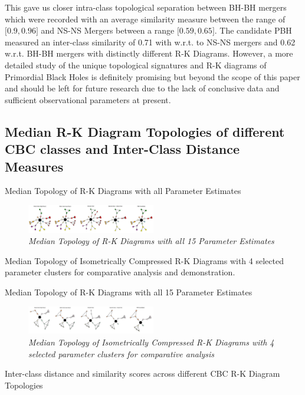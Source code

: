 This gave us closer intra-class topological separation between BH-BH mergers which were recorded with an average similarity measure between the range of $\lbrack0.9, 0.96\rbrack$ and NS-NS Mergers between a range   $\lbrack0.59, 0.65\rbrack$. The candidate PBH measured an inter-class similarity of 0.71 with w.r.t. to NS-NS mergers and 0.62 w.r.t. BH-BH mergers with distinctly different R-K Diagrams. However, a more detailed study of the unique topological signatures and R-K diagrams of Primordial Black Holes is definitely promising but beyond the scope of this paper and should be left for future research due to the lack of conclusive data and sufficient observational parameters at present.

\subsection {Median R-K Diagram Topologies of different CBC classes and Inter-Class Distance Measures}

Median Topology of R-K Diagrams with all Parameter Estimates 
\begin{figure}[H]
 	\centering
        \includegraphics[width=0.5\textwidth]{images/Median_Topologies_All_Parameters.jpg}
	\caption{\textit{Median Topology of R-K Diagrams with all 15 Parameter Estimates}}
	\label{fig:Median_Topo_All}
\end{figure}

Median Topology of Isometrically Compressed R-K Diagrams with 4 selected parameter clusters for comparative analysis and demonstration.

Median Topology of R-K Diagrams with all 15 Parameter Estimates 
\begin{figure}[H]
 	\centering
        \includegraphics[width=0.5\textwidth]{images/Median_Topology_of_Compressed_RK-Diagrams.jpg}
	\caption{\textit{Median Topology of  Isometrically Compressed R-K Diagrams with 4 selected parameter clusters for comparative analysis}}
	\label{fig:Median_Topo_Compressed}
\end{figure}

Inter-class distance and similarity scores across different CBC R-K Diagram Topologies

